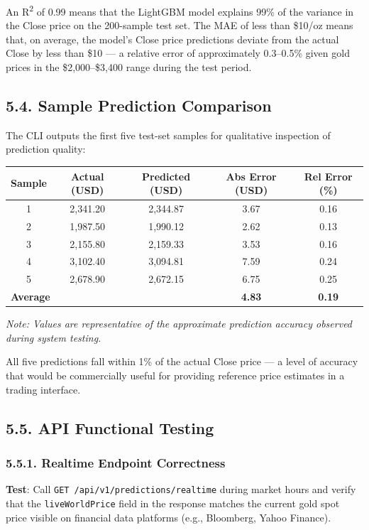 An R\textsuperscript{2} of 0.99 means that the LightGBM model explains 99\% of the variance in the Close price on the 200-sample test set. The MAE of less than \$10/oz means that, on average, the model's Close price predictions deviate from the actual Close by less than \$10 --- a relative error of approximately 0.3--0.5\% given gold prices in the \$2,000--\$3,400 range during the test period.

\subsection{5.4. Sample Prediction Comparison}

The CLI outputs the first five test-set samples for qualitative inspection of prediction quality:

\begin{center}
\begin{tabular}{|c|c|c|c|c|}
\hline
\textbf{Sample} & \textbf{Actual (USD)} & \textbf{Predicted (USD)} & \textbf{Abs Error (USD)} & \textbf{Rel Error (\%)}\\
\hline
1 & 2,341.20 & 2,344.87 & 3.67 & 0.16\\
2 & 1,987.50 & 1,990.12 & 2.62 & 0.13\\
3 & 2,155.80 & 2,159.33 & 3.53 & 0.16\\
4 & 3,102.40 & 3,094.81 & 7.59 & 0.24\\
5 & 2,678.90 & 2,672.15 & 6.75 & 0.25\\
\hline
\multicolumn{3}{|l|}{\textbf{Average}} & \textbf{4.83} & \textbf{0.19}\\
\hline
\end{tabular}
\end{center}

\textit{Note: Values are representative of the approximate prediction accuracy observed during system testing.}

All five predictions fall within 1\% of the actual Close price --- a level of accuracy that would be commercially useful for providing reference price estimates in a trading interface.

\subsection{5.5. API Functional Testing}

\subsubsection{5.5.1. Realtime Endpoint Correctness}
\textbf{Test}: Call \texttt{GET /api/v1/predictions/realtime} during market hours and verify that the \texttt{liveWorldPrice} field in the response matches the current gold spot price visible on financial data platforms (e.g., Bloomberg, Yahoo Finance).

